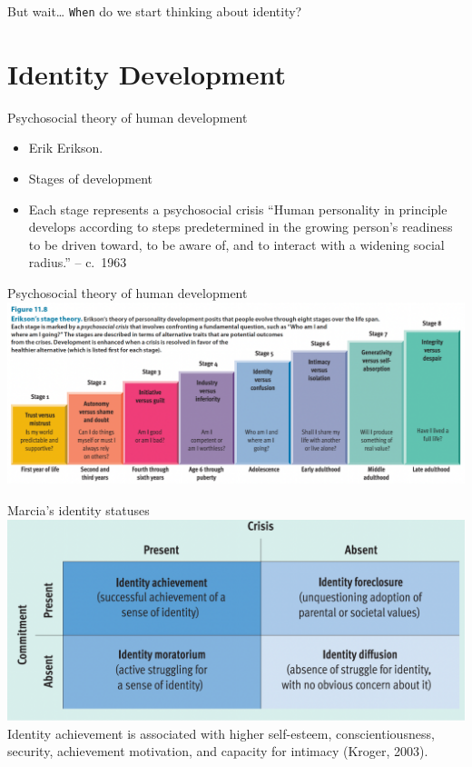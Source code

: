\documentclass[
  ignorenonframetext,
  aspectratio=169,
]{beamer}
\providecommand{\tightlist}{%
  \setlength{\itemsep}{0pt}\setlength{\parskip}{0pt}}\usepackage{longtable,booktabs,array}
\begin{document}
\begin{frame}[fragile]{But wait\ldots{}}
\label{but-wait}
\texttt{When} do we start thinking about identity?
\end{frame}

\section{Identity Development}\label{identity-development}

\begin{frame}{Psychosocial theory of human development}
\label{psychosocial-theory-of-human-development}
\begin{itemize}[<+->]
\tightlist
\item
  Erik Erikson.
\item
  Stages of development
\item
  Each stage represents a psychosocial crisis ``Human personality in
  principle develops according to steps predetermined in the growing
  person's readiness to be driven toward, to be aware of, and to
  interact with a widening social radius.'' -- c.~1963
\end{itemize}
\end{frame}

\begin{frame}{Psychosocial theory of human development}
\label{psychosocial-theory-of-human-development-1}
\includegraphics{stages.png}
\end{frame}

\begin{frame}{Marcia's identity statuses}
\label{marcias-identity-statuses}
\includegraphics{marcia.png} Identity achievement is associated with
higher self-esteem, conscientiousness, security, achievement motivation,
and capacity for intimacy (Kroger, 2003).
\end{frame}
\end{document}
